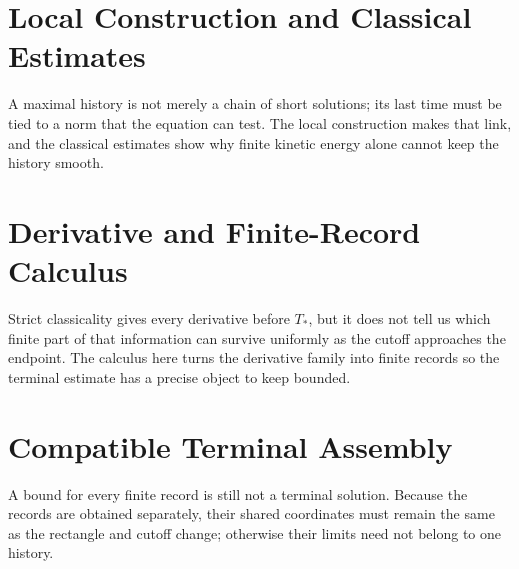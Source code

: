 \section{Local Construction and Classical Estimates}\label{app:LocalConstructionAndClassicalEstimates}

A maximal history is not merely a chain of short solutions; its last time must
be tied to a norm that the equation can test.  The local construction makes that
link, and the classical estimates show why finite kinetic energy alone cannot
keep the history smooth.




\section{Derivative and Finite-Record Calculus}\label{app:DerivativeAndFiniteRecordCalculus}\label{sec:FromCriticalHeightToCompatibleFiniteViews}

Strict classicality gives every derivative before \(T_*\), but it does not tell
us which finite part of that information can survive uniformly as the cutoff
approaches the endpoint.  The calculus here turns the derivative family into
finite records so the terminal estimate has a precise object to keep bounded.








\section{Compatible Terminal Assembly}\label{app:CompatibleTerminalAssembly}\label{sec:TheCompatibleIntersectionAtTheTerminalTime}

A bound for every finite record is still not a terminal solution.  Because the
records are obtained separately, their shared coordinates must remain the same
as the rectangle and cutoff change; otherwise their limits need not belong to
one history.






